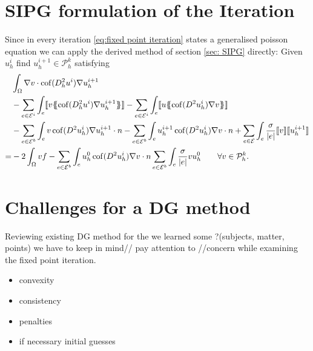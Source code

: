 \section{SIPG formulation of the Iteration}
Since in every iteration \eqref{eq:fixed point iteration} states a generalised poisson equation we can apply the derived  method of section \ref{sec: SIPG} directly: Given $u^i_h$ find $u^{i+1}_h \in \mathcal P^k_h$ satisfying
\begin{align*}
 &\int_{\Omega} \nabla v \cdot \cof(D_h^2 u^{i}) \nabla u_h^{i+1}\\
 & -\sum\limits_{e \in \bigEps^i}\int_{e} \jump {v \average { \cof(D_h^2 u^{i}) \nabla u_h^{i+1}} }
 - \sum\limits_{e \in \bigEps^i}\int_{e} \jump {u \average{ \cof(D^2 u_h^{i}) \nabla v} } \\  
 & - \sum\limits_{e \in \bigEps^b}\int_{e} v \cof(D^2 u_h^{i}) \nabla u_h^{i+1}\cdot n 
    - \sum\limits_{e \in \bigEps^b}\int_{e} u_h^{i+1}\cof(D^2 u_h^{i}) \nabla v \cdot n
    +\sum\limits_{e \in \bigEps} \int_e \frac \sigma {|e|} \jump v  \jump {u_h^{i+1}}\\
    =& - 2 \int_{\Omega}v f
    	 				-\sum\limits_{e \in \bigEps^b}\int_{e} u_h^0 \cof(D^2 u_h^{i}) \nabla v \cdot n 
    	 				\sum\limits_{e \in \bigEps^b} \int_e \frac \sigma {|e|} v u_h^0    \qquad \forall v \in  \mathcal P^k_h.
\end{align*}


\section{Challenges for a \MA DG method}
Reviewing existing DG method for the \MA we learned some ?(subjects, matter, points) we have to keep in mind// pay attention to //concern while examining the fixed point iteration.

\begin{itemize}
\item convexity
\item consistency
\item penalties
\item if necessary initial guesses
\end{itemize}

